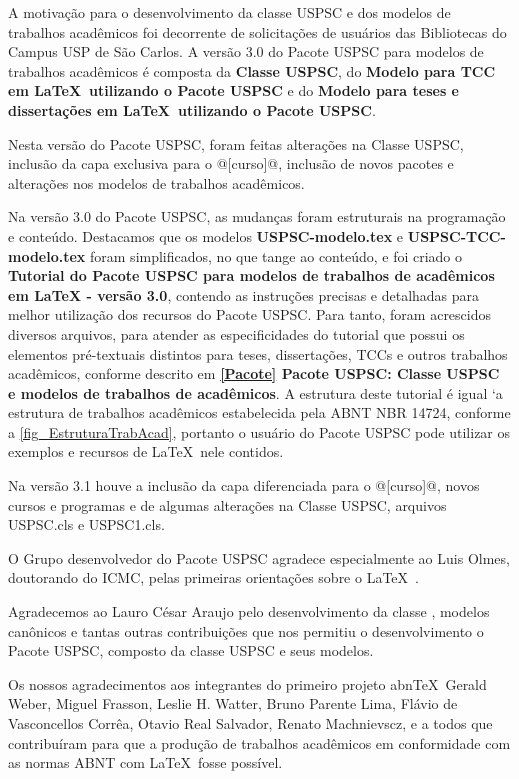 \begin{agradecimentos}
	A motivação para o desenvolvimento da classe USPSC e dos modelos de trabalhos acad\^emicos foi decorrente de solicitações de usu\'arios das Bibliotecas do Campus USP de São Carlos. A versão 3.0 do Pacote USPSC para modelos de trabalhos acad\^emicos \'e composta da \textbf{Classe USPSC}, do \textbf{Modelo para TCC em \LaTeX\ utilizando o Pacote USPSC} e do \textbf{Modelo para teses e dissertações em \LaTeX\ utilizando o Pacote USPSC}.
	
	Nesta versão do Pacote USPSC, foram feitas alterações na Classe USPSC, inclusão da capa exclusiva para o @[curso]@, inclusão de novos pacotes e alterações nos modelos de trabalhos acad\^emicos.
	
	Na versão 3.0 do Pacote USPSC, as mudanças foram estruturais na programação e conteúdo. Destacamos que os modelos \textbf{USPSC-modelo.tex} e \textbf{USPSC-TCC-modelo.tex} foram simplificados, no que tange ao conteúdo, e foi criado o \textbf{Tutorial do Pacote USPSC para modelos de trabalhos de acad\^emicos em LaTeX - vers\~ao 3.0}, contendo as instruções precisas e detalhadas para melhor utilização dos recursos do Pacote USPSC. Para tanto, foram acrescidos diversos arquivos, para atender as especificidades do tutorial que possui os elementos pr\'e-textuais distintos para teses, dissertações, TCCs e outros trabalhos acad\^emicos, conforme descrito em  \textbf{\ref{Pacote} Pacote USPSC: Classe USPSC e modelos de trabalhos de acad\^emicos}. A estrutura deste tutorial \'e igual `a  estrutura de trabalhos acad\^emicos estabelecida pela ABNT NBR 14724, conforme a \autoref{fig_EstruturaTrabAcad}, portanto o usu\'ario do Pacote USPSC pode utilizar os exemplos e recursos de \LaTeX\ nele contidos.	
	 
	Na versão 3.1 houve a inclusão da capa diferenciada para o @[curso]@, novos cursos e programas e de algumas alterações na Classe USPSC, arquivos USPSC.cls e  USPSC1.cls.
	
	O Grupo desenvolvedor do Pacote USPSC agradece especialmente ao Luis Olmes, doutorando do ICMC, pelas primeiras orientações sobre o \LaTeX\ . 
	
	Agradecemos ao Lauro C\'esar Araujo pelo desenvolvimento da classe  \abnTeX, modelos canônicos e tantas outras contribuições que nos permitiu o desenvolvimento o Pacote USPSC, composto da classe USPSC e seus modelos.
	
	Os nossos agradecimentos aos integrantes do primeiro
	projeto abn\TeX\, Gerald Weber, Miguel Frasson, Leslie H. Watter, Bruno Parente Lima, Fl\'avio de Vasconcellos Corr\^ea, Otavio Real
	Salvador, Renato Machnievscz, e a todos que contribuíram para que a produção de trabalhos acad\^emicos em conformidade com
	as normas ABNT com \LaTeX\ fosse possível.
	

\end{agradecimentos}

